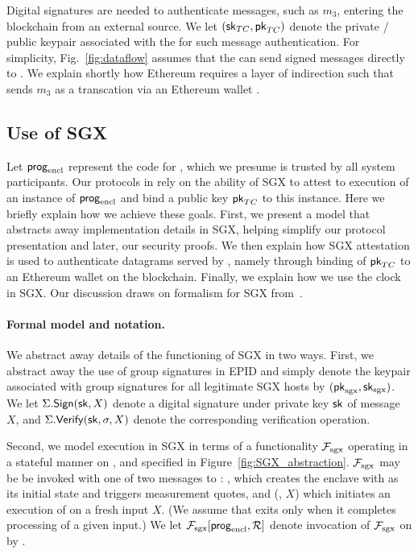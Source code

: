 Digital signatures are needed to authenticate messages, such as $m_3$, entering the blockchain from an external source. We let $({\sf sk}_{TC}, {\sf pk}_{TC})$ denote the private / public keypair associated with the \encname for such message authentication. For simplicity, Fig.~\ref{fig:dataflow} assumes that the \encname can send signed messages directly to \tcont. We explain shortly how Ethereum requires a layer of indirection such that \tc sends $m_3$ as a transcation via an Ethereum wallet \tcadd.


\subsection{Use of SGX}

Let ${\sf prog}_{\textrm{encl}}$ represent the code for \encname, which we presume is trusted by all system participants. Our protocols in \tc rely on the ability of SGX to attest to execution of an instance of ${\sf prog}_{\textrm{encl}}$ and bind a public key ${\sf pk}_{TC}$ to this instance. Here we briefly explain how we achieve these goals. First, we present a model that abstracts away implementation details in SGX, helping simplify our protocol presentation and later, our security proofs. We then explain how SGX attestation is used to authenticate datagrams served by \tcont, namely through binding of ${\sf pk}_{TC}$ to an Ethereum wallet on the blockchain. Finally, we explain how we use the clock in SGX. Our discussion draws on formalism for SGX from~\cite{ElainesSGXpaper}.



\paragraph{\bf Formal model and notation.} 

We abstract away details of the functioning of SGX in two ways.
First, we abstract away the use of group signatures in EPID and simply denote the keypair associated with group signatures for all legitimate SGX hosts by $({\sf pk}_{\mathrm{sgx}}, {\sf sk}_{\mathrm{sgx}})$. 
We let $\Sigma.{\sf Sign}({{\sf sk}}, X)$ denote a digital signature under private key ${\sf sk}$ of message $X$, and $\Sigma.{\sf Verify}({{\sf sk}}, \sigma, X)$ denote the corresponding verification operation. 

Second, we model execution in SGX in terms of a functionality $\mathcal{F}_{\textrm{sgx}}$ operating in a stateful manner on \enclaveprog {}, and specified in Figure~\ref{fig:SGX_abstraction}. $\mathcal{F}_{\textrm{sgx}}$ may be be invoked with one of two messages to \enclaveprog : \initcall, which creates the enclave with \enclaveprog as its initial state and triggers measurement quotes, and (\resumecall, $X$) which initiates an execution of \enclaveprog on a fresh input $X$. (We assume that \enclaveprog exits only when it completes processing of a given input.) We let $\mathcal{F}_{\textrm{sgx}}[{\sf prog}_{\textrm{encl}}, \mathcal{R}]$ denote invocation of $\mathcal{F}_{\textrm{sgx}}$ on \enclaveprog by \relay. 


